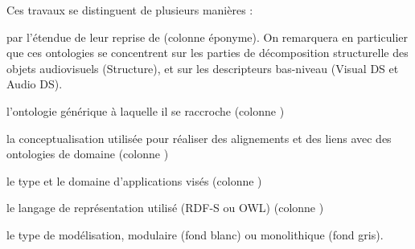 Ces travaux se distinguent de plusieurs manières : 
\begin{liste}
	\item par l'étendue de leur reprise de  (colonne éponyme).
	On remarquera en particulier que ces ontologies se concentrent sur les parties de décomposition structurelle des objets audiovisuels (Structure), et sur les descripteurs bas-niveau (Visual DS et Audio DS).
	\item l'ontologie générique à laquelle il se raccroche (colonne ) 
	\item la conceptualisation utilisée pour réaliser des alignements et des liens avec des ontologies de domaine (colonne ) 
	\item le type et le domaine d'applications visés (colonne ) 
	\item le langage de représentation utilisé (RDF-S ou OWL) (colonne ) 
	\item le type de modélisation, modulaire (fond blanc) ou monolithique (fond gris).
\end{liste}

